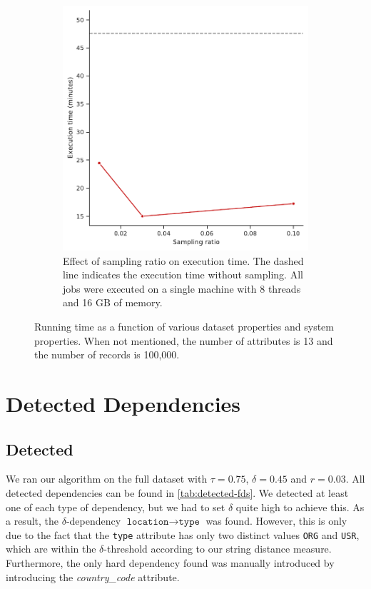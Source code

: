 \documentclass{article}
\begin{document}
\begin{figure}
\begin{subfigure}[t]{0.45\textwidth}
            \includegraphics[width=\textwidth]{figures/plot_sampling_ratio.pdf}
            \caption{Effect of sampling ratio on execution time. The dashed line indicates the execution time without sampling. All jobs were executed on a single machine with 8 threads and 16 GB of memory.}
            \label{fig:plot sampling ratio}
        \end{subfigure}
        \caption{Running time as a function of various dataset properties and system properties. When not mentioned, the number of attributes is 13 and the number of records is 100,000.}
        \label{fig:three graphs}
    \end{figure}

\section{Detected Dependencies} 

    \subsection{Detected}
    
    We ran our algorithm on the full dataset with $\tau = 0.75$, $\delta = 0.45$ and $r = 0.03$. All detected dependencies can be found in \autoref{tab:detected-fds}. We detected at least one of each type of dependency, but we had to set $\delta$ quite high to achieve this. As a result, the $\delta$-dependency $\texttt{location} \rightarrow \texttt{type}$ was found. However, this is only due to the fact that the \texttt{type} attribute has only two distinct values \texttt{ORG} and \texttt{USR}, which are within the $\delta$-threshold according to our string distance measure. Furthermore, the only hard dependency found was manually introduced by introducing the \textit{country\_code} attribute.  
    
\end{document}

